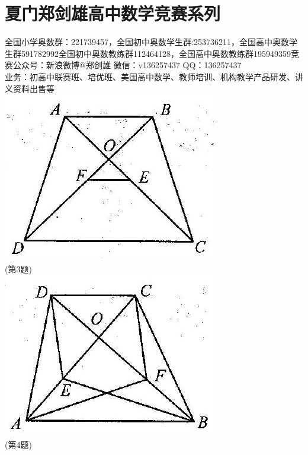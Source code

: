 \documentclass[10pt]{article}
\begin{document}
\section*{夏门郑剑雄高中数学竞赛系列}
全国小学奥数群：221739457，全国初中奥数学生群:253736211，全国高中奥数学生群591782992全国初中奥数教练群112464128，全国高中奥数教练群195949359竞赛公众号：新浪微博@郑剑雄 微信：v136257437 QQ：136257437\\
业务：初高中联赛班、培优班、美国高中数学、教师培训、机构教学产品研发、讲义资料出售等\\
\includegraphics[max width=\textwidth, center]{2024_10_30_2c8f45efd4a519b08e1ag-145}\\
(第3题)\\
\includegraphics[max width=\textwidth, center]{2024_10_30_2c8f45efd4a519b08e1ag-145(1)}\\
(第4题)
\end{document}
